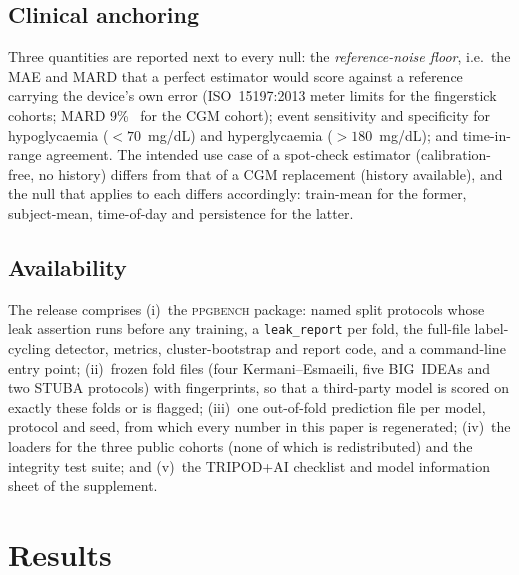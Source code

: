 \documentclass[journal]{IEEEtran}
\begin{document}
\subsection{Clinical anchoring}
\label{sec:clinical}
Three quantities are reported next to every null: the \emph{reference-noise
floor}, i.e.\ the MAE and MARD that a perfect estimator would score against a
reference carrying the device's own error (ISO~15197:2013 meter limits for
the fingerstick cohorts; MARD 9\%~\cite{shah2018g6} for the CGM cohort);
event sensitivity and specificity for hypoglycaemia ($<70$~mg/dL) and
hyperglycaemia ($>180$~mg/dL); and time-in-range agreement.  The intended
use case of a spot-check estimator (calibration-free, no history) differs
from that of a CGM replacement (history available), and the null that
applies to each differs accordingly: train-mean for the former,
subject-mean, time-of-day and persistence for the latter.

\subsection{Availability}
\label{sec:availability}
The release comprises (i)~the \textsc{ppgbench} package: named split
protocols whose leak assertion runs before any training, a
\texttt{leak\_report} per fold, the full-file label-cycling detector,
metrics, cluster-bootstrap and report code, and a command-line entry point;
(ii)~frozen fold files (four Kermani--Esmaeili, five BIG~IDEAs and two STUBA
protocols) with fingerprints, so that a third-party model is scored on
exactly these folds or is flagged; (iii)~one out-of-fold prediction file per
model, protocol and seed, from which every number in this paper is
regenerated; (iv)~the loaders for the three public cohorts (none of which is
redistributed) and the integrity test suite; and (v)~the TRIPOD+AI checklist
and model information sheet of the supplement.

\section{Results}
\label{sec:results}
\end{document}
